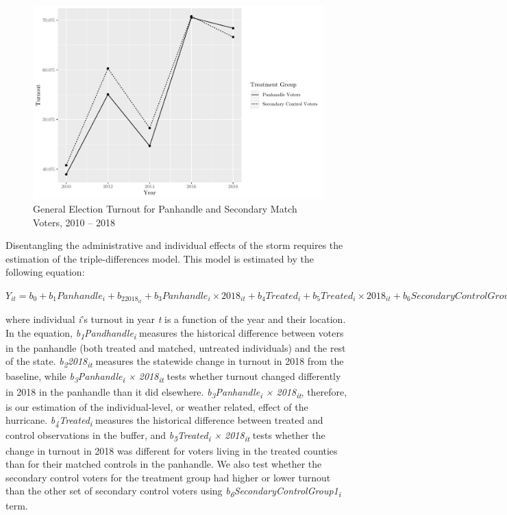 \documentclass[
  12pt,
]{article}
\begin{document}
\begin{figure}[H]

{\centering \includegraphics{hurricane_michael_files/figure-latex/second-parallel-chunk-1} 

}

\caption{\label{fig:second-parallel}General Election Turnout for Panhandle and Secondary Match Voters, 2010 -- 2018}\label{fig:second-parallel-chunk}
\end{figure}

Disentangling the administrative and individual effects of the storm requires the estimation of the triple-differences model. This model is estimated by the following equation:

\(Y_{it}=b_0+b_1Panhandle_{i}+b_22018_{it}+b_3Panhandle_{i}\times 2018_{it} + b_4Treated_{i} + b_5Treated_{i}\times 2018_{it} + b_6Secondary Control Group 1_{i}\)

where individual \emph{i}'s turnout in year \emph{t} is a function of the year and their location. In the equation, \emph{b\textsubscript{1}Pandhandle\textsubscript{i}} measures the historical difference between voters in the panhandle (both treated and matched, untreated individuals) and the rest of the state. \emph{b\textsubscript{2}2018\textsubscript{it}} measures the statewide change in turnout in 2018 from the baseline, while \emph{b\textsubscript{3}Panhandle\textsubscript{i} × 2018\textsubscript{it}} tests whether turnout changed differently in 2018 in the panhandle than it did elsewhere. \emph{b\textsubscript{3}Panhandle\textsubscript{i} × 2018\textsubscript{it}}, therefore, is our estimation of the individual-level, or weather related, effect of the hurricane. \emph{b\textsubscript{4}Treated\textsubscript{i}} measures the historical difference between treated and control observations in the buffer, and \emph{b\textsubscript{5}Treated\textsubscript{i} × 2018\textsubscript{it}} tests whether the change in turnout in 2018 was different for voters living in the treated counties than for their matched controls in the panhandle. We also test whether the secondary control voters for the treatment group had higher or lower turnout than the other set of secondary control voters using \emph{b\textsubscript{6}SecondaryControlGroup1\textsubscript{i}} term.
\end{document}
